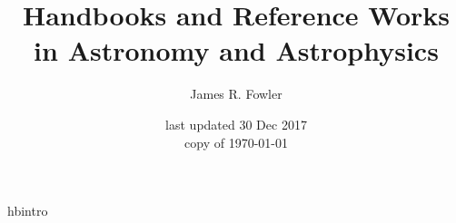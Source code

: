 \documentclass{article}
\begin{document}
\title{Handbooks and Reference Works in Astronomy and Astrophysics}
\author{James R. Fowler}
\date{last updated 30 Dec 2017\\ copy of \today}

\maketitle

\tableofcontents
\listoftables


{hbintro}
\end{document}
